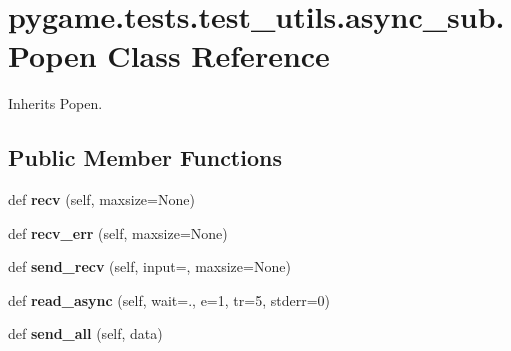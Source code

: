 \hypertarget{classpygame_1_1tests_1_1test__utils_1_1async__sub_1_1_popen}{}\section{pygame.\+tests.\+test\+\_\+utils.\+async\+\_\+sub.\+Popen Class Reference}
\label{classpygame_1_1tests_1_1test__utils_1_1async__sub_1_1_popen}


Inherits Popen.

\subsection*{Public Member Functions}
\begin{DoxyCompactItemize}
\item 
\mbox{\label{classpygame_1_1tests_1_1test__utils_1_1async__sub_1_1_popen_a41d8cb33d16dbc2839ba78aadc4a0ea7}} 
def {\bfseries recv} (self, maxsize=None)
\item 
\mbox{\label{classpygame_1_1tests_1_1test__utils_1_1async__sub_1_1_popen_a1e526e6b5f1d82806d3a815cb63eb4f2}} 
def {\bfseries recv\+\_\+err} (self, maxsize=None)
\item 
\mbox{\label{classpygame_1_1tests_1_1test__utils_1_1async__sub_1_1_popen_a28af740f1fbae9566938ccf6377a3de6}} 
def {\bfseries send\+\_\+recv} (self, input=\textquotesingle{}\textquotesingle{}, maxsize=None)
\item 
\mbox{\label{classpygame_1_1tests_1_1test__utils_1_1async__sub_1_1_popen_a842aa2adaa6cf49954cb20cec7fc4f0c}} 
def {\bfseries read\+\_\+async} (self, wait=., e=1, tr=5, stderr=0)
\item 
\mbox{\label{classpygame_1_1tests_1_1test__utils_1_1async__sub_1_1_popen_aab337c70598ad97715d6466114e99a7e}} 
def {\bfseries send\+\_\+all} (self, data)
\item 
\mbox{\label{classpygame_1_1tests_1_1test__utils_1_1async__sub_1_1_popen_a3163fffe8be7b5d95a8ae7031e033ec8}} 

\end{DoxyCompactItemize}
